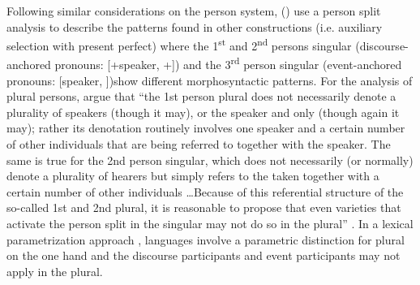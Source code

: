 \documentclass[output=paper]{langsci/langscibook}
\begin{document}
Following similar considerations on the person system, \citeauthor{Manzini2007}\linebreak (\citeyear{Manzini2007,Manzini2011Bio}) use a person split analysis to describe the patterns found in other constructions (i.e. auxiliary selection with present perfect) where the 1\textsuperscript{st} and 2\textsuperscript{nd} persons singular (discourse-anchored pronouns: [+speaker, +]) and the 3\textsuperscript{rd} person singular (event-anchored pronouns: [\textminus{}speaker, \textminus{}])\linebreak show different morphosyntactic patterns. For the analysis of plural persons, \citet{Manzini2011Bio} argue that “the 1st person plural does not necessarily denote a plurality of speakers (though it may), or the speaker and  only (though again it may); rather its denotation routinely involves one speaker and a certain number of other individuals that are being referred to together with the speaker. The same is true for the 2nd person singular, which does not necessarily (or normally) denote a plurality of hearers but simply refers to the  taken together with a certain number of other individuals …Because of this referential structure of the so-called 1st and 2nd plural, it is reasonable to propose that even varieties that activate the person split in the singular may not do so in the plural” \citep[213]{Manzini2011Bio}. In a lexical parametrization approach \citep{Manzini1987,Manzini2011Bio}, languages involve a parametric distinction for plural on the one hand and the discourse participants and event participants may not apply in the plural. 
\end{document}

